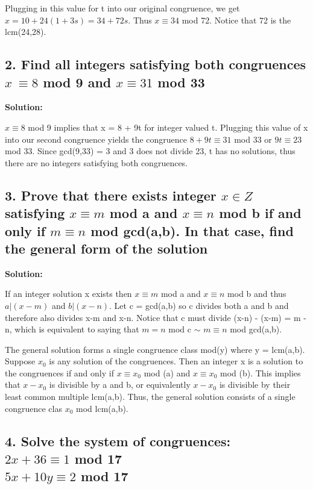 \documentclass{article}
\begin{document}
\begin{spacing}{1.1}
Plugging in this value for t into our original congruence, we get $x = 10 + 24(1+3s) = 34 + 72s$.  Thus $x \equiv 34$ mod 72.  Notice that 72 is the lcm(24,28).  

\vfill

\subsection{2.  Find all integers satisfying both congruences $x\ \equiv 8$ mod 9 and $x \equiv 31$ mod 33}

\textbf{Solution: }

$x \equiv 8$ mod 9 implies that x = 8 + 9t for integer valued t.  Plugging this value of x into our second congruence yields the congruence $8 + 9t \equiv 31$ mod 33 or $9t \equiv 23$ mod 33.  Since gcd(9,33) = 3 and 3 does not divide 23, t has no solutions, thus there are no integers satisfying both congruences. 


\vfill

\subsection{3.  Prove that there exists integer $x \in Z$ satisfying $x \equiv m$ mod a and $x \equiv n$ mod b if and only if $m \equiv n$ mod gcd(a,b).  In that case, find the general form of the solution}

\textbf{Solution: }

If an integer solution x exists then $x \equiv m$ mod a and $x \equiv n$ mod b and thus $a | (x-m)$ and $b | (x - n)$.  Let c = gcd(a,b) so c divides both a and b and therefore also divides x-m and x-n.  Notice that c must divide (x-n) - (x-m) = m - n, which is equivalent to saying that $m = n$ mod c $\sim$ $ m\equiv n$ mod gcd(a,b).  

The general solution forms a single congruence class mod(y) where y = lcm(a,b).  Suppose $x_0$ is any solution of the congruences.  Then an integer x is a solution to the congruences if and only if $x \equiv x_0$ mod (a) and $x \equiv x_0$ mod (b).  This implies that $x - x_0$ is divisible by a and b, or equivalently $x - x_0$ is divisible by their least common multiple lcm(a,b).  Thus, the general solution consists of a single congruence clas $x_0$ mod lcm(a,b).  

\vfill

\subsection{4.  Solve the system of congruences: 
\\$ 2x + 36 \equiv 1$ mod 17
\\$ 5x + 10y \equiv 2$ mod 17}


\end{spacing}
\end{document}
